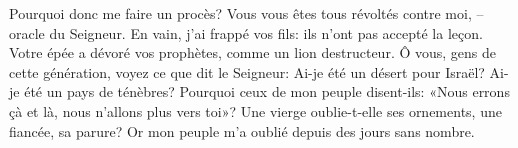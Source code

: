 Pourquoi donc me faire un procès?
	Vous vous êtes tous révoltés contre moi, – oracle du Seigneur.
En vain, j’ai frappé vos fils: ils n’ont pas accepté la leçon.
Votre épée a dévoré vos prophètes, comme un lion destructeur.
Ô vous, gens de cette génération, voyez ce que dit le Seigneur:
	Ai-je été un désert pour Israël? Ai-je été un pays de ténèbres?
	Pourquoi ceux de mon peuple disent-ils:
	«Nous errons çà et là, nous n’allons plus vers toi»?
Une vierge oublie-t-elle ses ornements, une fiancée, sa parure?
	Or mon peuple m’a oublié depuis des jours sans nombre.
